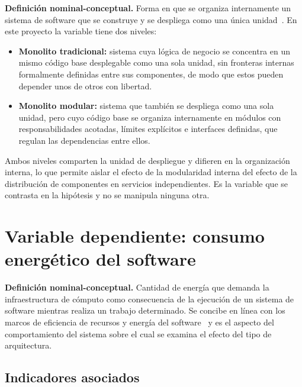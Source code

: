 \textbf{Definición nominal-conceptual.} Forma en que se organiza internamente un sistema de software que se construye y se despliega como una única unidad~\cite{aldebagy2018comparative}. En este proyecto la variable tiene dos niveles:
\begin{itemize}
  \item \textbf{Monolito tradicional:} sistema cuya lógica de negocio se concentra en un mismo código base desplegable como una sola unidad, sin fronteras internas formalmente definidas entre sus componentes, de modo que estos pueden depender unos de otros con libertad.
  \item \textbf{Monolito modular:} sistema que también se despliega como una sola unidad, pero cuyo código base se organiza internamente en módulos con responsabilidades acotadas, límites explícitos e interfaces definidas, que regulan las dependencias entre ellos.
\end{itemize}

Ambos niveles comparten la unidad de despliegue y difieren en la organización interna, lo que permite aislar el efecto de la modularidad interna del efecto de la distribución de componentes en servicios independientes. Es la variable que se contrasta en la hipótesis y no se manipula ninguna otra.

\section{Variable dependiente: consumo energético del software}
\label{sec:var-dep}

\textbf{Definición nominal-conceptual.} Cantidad de energía que demanda la infraestructura de cómputo como consecuencia de la ejecución de un sistema de software mientras realiza un trabajo determinado. Se concibe en línea con los marcos de eficiencia de recursos y energía del software~\cite{kern2018sustainable} y es el aspecto del comportamiento del sistema sobre el cual se examina el efecto del tipo de arquitectura.

\subsection{Indicadores asociados}
\label{sec:indicadores}

